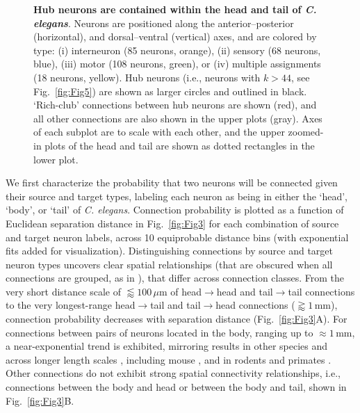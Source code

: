\documentclass[10pt,letterpaper]{article}
\begin{document}
\begin{figure}[h]
\centering
\caption{
\textbf{Hub neurons are contained within the head and tail of \emph{C. elegans}}.
Neurons are positioned along the anterior--posterior (horizontal), and dorsal--ventral (vertical) axes, and are colored by type:
(i) interneuron (85 neurons, orange),
(ii) sensory (68 neurons, blue),
(iii) motor (108 neurons, green), or
(iv) multiple assignments (18 neurons, yellow).
Hub neurons (i.e., neurons with $k > 44$, see Fig.~\ref{fig:Fig5}) are shown as larger circles and outlined in black.
`Rich-club' connections between hub neurons are shown (red), and all other connections are also shown in the upper plots (gray).
Axes of each subplot are to scale with each other, and the upper zoomed-in plots of the head and tail are shown as dotted rectangles in the lower plot.
\label{fig:Fig2}
}
\end{figure}

We first characterize the probability that two neurons will be connected given their source and target types, labeling each neuron as being in either the `head', `body', or `tail' of \emph{C. elegans}.
Connection probability is plotted as a function of Euclidean separation distance in Fig.~\ref{fig:Fig3} for each combination of source and target neuron labels, across 10 equiprobable distance bins (with exponential fits added for visualization).
Distinguishing connections by source and target neuron types uncovers clear spatial relationships (that are obscured when all connections are grouped, as in \cite{Azulay:2016cg}), that differ across connection classes.
From the very short distance scale of $\lessapprox 100\,\mu$m of head$\rightarrow$head and tail$\rightarrow$tail connections to the very longest-range head$\rightarrow$tail and tail$\rightarrow$head connections ($\gtrapprox 1\,$mm), connection probability decreases with separation distance (Fig.~\ref{fig:Fig3}A).
For connections between pairs of neurons located in the body, ranging up to $\approx 1$\,mm, a near-exponential trend is exhibited, mirroring results in other species and across longer length scales \cite{Wang:2016gg}, including mouse \cite{Goulas:2016hr, Fulcher:2016ck}, and in rodents and primates \cite{Horvat:2016ia}.
Other connections do not exhibit strong spatial connectivity relationships, i.e., connections between the body and head or between the body and tail, shown in Fig.~\ref{fig:Fig3}B.
\end{document}
